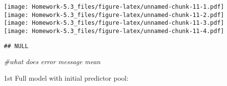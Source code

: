 \documentclass[
]{article}
\newenvironment{Shaded}{\begin{snugshade}}{\end{snugshade}}
\newcommand{\CommentTok}[1]{\textcolor[rgb]{0.56,0.35,0.01}{\textit{#1}}}
\begin{document}
\texttt{[image: Homework-5.3\_files/figure-latex/unnamed-chunk-11-1.pdf]}
\texttt{[image: Homework-5.3\_files/figure-latex/unnamed-chunk-11-2.pdf]}
\texttt{[image: Homework-5.3\_files/figure-latex/unnamed-chunk-11-3.pdf]}
\texttt{[image: Homework-5.3\_files/figure-latex/unnamed-chunk-11-4.pdf]}

\begin{verbatim}
## NULL
\end{verbatim}

\begin{Shaded}
\begin{Highlighting}[]
\CommentTok{#what does error message mean}
\end{Highlighting}
\end{Shaded}

1st Full model with initial predictor pool:
\end{document}
